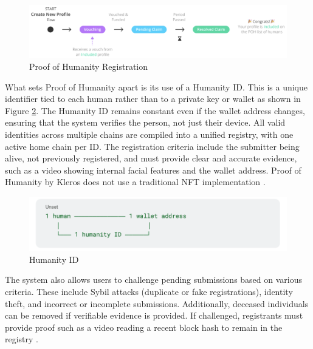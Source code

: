 \documentclass[conference]{IEEEtran}
\begin{document}
\begin{figure}[h!]
    \centering
    \includegraphics[width=0.9\linewidth]{poh-kleros.png}
    \caption{Proof of Humanity Registration}
    \label{fig:poh-kleros}
\end{figure}

What sets Proof of Humanity apart is its use of a Humanity ID. This is a unique identifier tied to each human rather than to a private key or wallet as shown in Figure \ref{fig:poh-humanity-id}. The Humanity ID remains constant even if the wallet address changes, ensuring that the system verifies the person, not just their device. All valid identities across multiple chains are compiled into a unified registry, with one active home chain per ID. The registration criteria include the submitter being alive, not previously registered, and must provide clear and accurate evidence, such as a video showing internal facial features and the wallet address. Proof of Humanity by Kleros does not use a traditional NFT implementation \cite{poh-policy}.

\begin{figure}[h!]
    \centering
    \includegraphics[width=0.9\linewidth]{poh-humanity-id.png}
    \caption{Humanity ID}
    \label{fig:poh-humanity-id}
\end{figure}

The system also allows users to challenge pending submissions based on various criteria. These include Sybil attacks (duplicate or fake registrations), identity theft, and incorrect or incomplete submissions. Additionally, deceased individuals can be removed if verifiable evidence is provided. If challenged, registrants must provide proof such as a video reading a recent block hash to remain in the registry \cite{poh-policy}.
\end{document}
